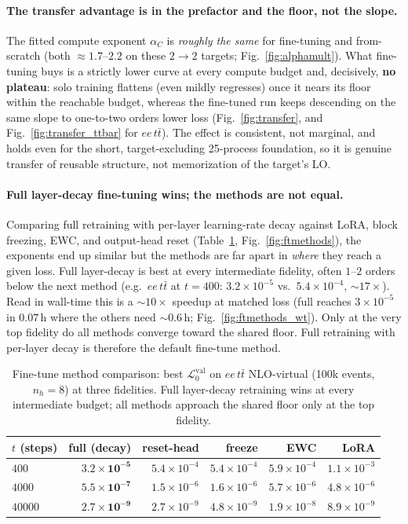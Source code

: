 \documentclass[11pt]{article}
\newcommand{\vlnr}{\mathcal{L}^{\mathrm{val}}_{0}}   %
\newcommand{\nh}{n_h}
\begin{document}
\paragraph{The transfer advantage is in the prefactor and the floor, not the slope.} The fitted
compute exponent $\alpha_C$ is \emph{roughly the same} for fine-tuning and from-scratch (both
$\approx\!1.7$--$2.2$ on these $2\!\to\!2$ targets; Fig.~\ref{fig:alphamult}). What fine-tuning
buys is a strictly lower curve at every compute budget and, decisively, \textbf{no plateau}:
solo training flattens (even mildly regresses) once it nears its floor within the reachable
budget, whereas the fine-tuned run keeps descending on the same slope to one-to-two orders lower
loss (Fig.~\ref{fig:transfer}, and Fig.~\ref{fig:transfer_ttbar} for $ee\,t\bar t$). The effect is consistent, not marginal, and holds even for the
short, target-excluding 25-process foundation, so it is genuine transfer of reusable structure,
not memorization of the target's LO.

\paragraph{Full layer-decay fine-tuning wins; the methods are not equal.} Comparing full
retraining with per-layer learning-rate decay against LoRA, block freezing, EWC, and output-head
reset (Table~\ref{tab:ftmethods}, Fig.~\ref{fig:ftmethods}), the exponents end up similar but the methods are far apart in
\emph{where} they reach a given loss. Full layer-decay is best at every intermediate fidelity,
often $1$--$2$ orders below the next method (e.g.\ $ee\,t\bar t$ at $t=400$: $3.2\times10^{-5}$
vs.\ $5.4\times10^{-4}$, $\sim\!17\times$). Read in wall-time this is a $\sim\!10\times$ speedup at
matched loss (full reaches $3\times10^{-5}$ in $0.07$\,h where the others need $\sim\!0.6$\,h;
Fig.~\ref{fig:ftmethods_wt}). Only at the very top fidelity do all methods converge toward the shared
floor. Full retraining with per-layer decay is therefore the default fine-tune method.

\begin{table}[H]
\centering
\caption{Fine-tune method comparison: best $\vlnr$ on $ee\,t\bar t$ NLO-virtual (100k events,
$\nh=8$) at three fidelities. Full layer-decay retraining wins at every intermediate budget; all
methods approach the shared floor only at the top fidelity.}
\label{tab:ftmethods}
\begin{tabular}{@{}lrrrrr@{}}
\toprule
$t$ (steps) & full (decay) & reset-head & freeze & EWC & LoRA \\
\midrule
$400$   & $\mathbf{3.2\times10^{-5}}$ & $5.4\times10^{-4}$ & $5.4\times10^{-4}$ & $5.9\times10^{-4}$ & $1.1\times10^{-3}$ \\
$4000$  & $\mathbf{5.5\times10^{-7}}$ & $1.5\times10^{-6}$ & $1.6\times10^{-6}$ & $5.7\times10^{-6}$ & $4.8\times10^{-6}$ \\
$40000$ & $\mathbf{2.7\times10^{-9}}$ & $2.7\times10^{-9}$ & $4.8\times10^{-9}$ & $1.9\times10^{-8}$ & $8.9\times10^{-9}$ \\
\bottomrule
\end{tabular}
\end{table}
\end{document}

